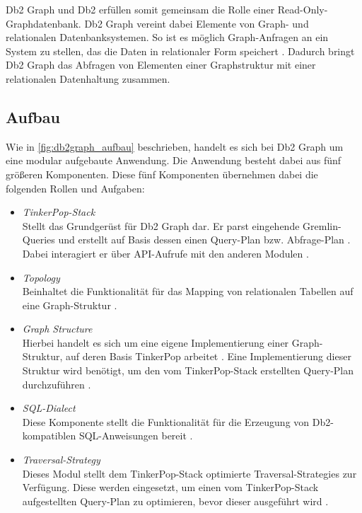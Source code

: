 Db2 Graph und Db2 erfüllen somit gemeinsam die Rolle einer Read-Only-Graph\-daten\-bank. Db2 Graph vereint dabei Elemente von Graph- und relationalen Datenbanksystemen. So ist es möglich Graph-Anfragen an ein System zu stellen, das die Daten in relationaler Form speichert \cite{vldb_tian, sigmod_tian}. Dadurch bringt Db2 Graph das Abfragen von Elementen einer Graphstruktur mit einer relationalen Datenhaltung zusammen. 

\subsection{Aufbau}
Wie in \autoref{fig:db2graph_aufbau} beschrieben, handelt es sich bei Db2 Graph um eine modular aufgebaute Anwendung. Die Anwendung besteht dabei aus fünf größeren Komponenten. Diese fünf Komponenten übernehmen dabei die folgenden Rollen und Aufgaben: 

\begin{itemize}
    \item \textit{TinkerPop-Stack}\\Stellt das Grundgerüst für Db2 Graph dar. Er parst eingehende Gremlin-Queries und erstellt auf Basis dessen einen Query-Plan bzw. Abfrage-Plan \cite{vldb_tian}. Dabei interagiert er über API-Aufrufe mit den anderen Modulen \cite{vldb_tian}.
    \item \textit{Topology}\\Beinhaltet die Funktionalität für das Mapping von relationalen Tabellen auf eine Graph-Struktur \cite{vldb_tian, sigmod_tian}.
    \item \textit{Graph Structure}\\Hierbei handelt es sich um eine eigene Implementierung einer Graph-Struktur, auf deren Basis TinkerPop arbeitet \cite{vldb_tian}. Eine Implementierung dieser Struktur wird benötigt, um den vom TinkerPop-Stack erstellten Query-Plan durchzuführen \cite{sigmod_tian}. 
    \item \textit{SQL-Dialect}\\Diese Komponente stellt die Funktionalität für die Erzeugung von Db2-kompatiblen SQL-Anweisungen bereit \cite{sigmod_tian}.
    \item \textit{Traversal-Strategy}\\Dieses Modul stellt dem TinkerPop-Stack optimierte Traversal-Strategies zur Verfügung. Diese werden eingesetzt, um einen vom TinkerPop-Stack aufgestellten Query-Plan zu optimieren, bevor dieser ausgeführt wird \cite{sigmod_tian}.  
\end{itemize}

